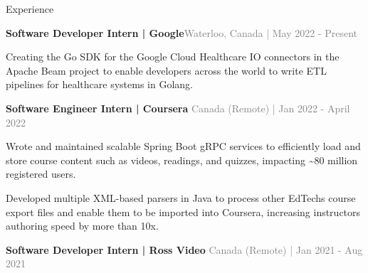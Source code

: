 \documentclass[hidelinks]{resume} %
\begin{document}
\vspace{-.20cm}
\begin{rSection}{Experience}
\vspace{-.1cm}
\begin{rSubsection}{\textbf{Software Developer Intern | Google}}{\textcolor{gray}{\small Waterloo, Canada | May 2022 - Present}}{}
        \par
        \begin{bulletpoints}
            \vspace{-.10cm}
            \item Creating the Go SDK for the Google Cloud Healthcare IO connectors in the Apache Beam project to enable developers across the world to write ETL pipelines for healthcare systems in Golang.
             \vspace{-.10cm}
        \end{bulletpoints}
\end{rSubsection}
\begin{rSubsection}{\textbf{Software Engineer Intern | Coursera} }{\textcolor{gray}{\small Canada (Remote) | Jan 2022 - April 2022}}{}

    \begin{bulletpoints}
        \vspace{-.10cm}
        \item Wrote and maintained scalable Spring Boot gRPC services to efficiently load and store course content such as videos, readings, and quizzes, impacting \textasciitilde 80 million registered users.
        \vspace{-.13cm}
        \item Developed multiple XML-based parsers in Java to process other EdTechs course export files and enable them to be imported into Coursera, increasing instructors authoring speed by more than 10x.
        \vspace{-.10cm}
    \end{bulletpoints}
\end{rSubsection}
\begin{rSubsection}{\textbf{Software Developer Intern | Ross Video} }{\textcolor{gray}{\small Canada (Remote) | Jan 2021 - Aug 2021}}{}


\end{rSubsection}
\end{rSection}
\end{document}

